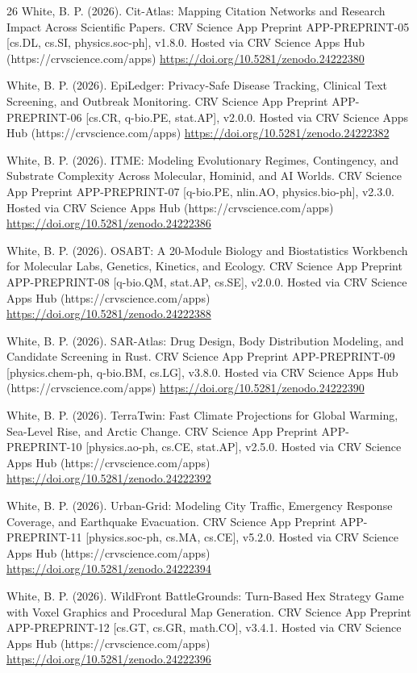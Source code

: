 \documentclass[10pt,letterpaper]{article}
\begin{document}
\begin{thebibliography}{26}
 White, B. P. (2026). Cit-Atlas: Mapping Citation Networks and Research Impact Across Scientific Papers. CRV Science App Preprint APP-PREPRINT-05 [cs.DL, cs.SI, physics.soc-ph], v1.8.0. Hosted via CRV Science Apps Hub (https://crvscience.com/apps) \url{https://doi.org/10.5281/zenodo.24222380}

 White, B. P. (2026). EpiLedger: Privacy-Safe Disease Tracking, Clinical Text Screening, and Outbreak Monitoring. CRV Science App Preprint APP-PREPRINT-06 [cs.CR, q-bio.PE, stat.AP], v2.0.0. Hosted via CRV Science Apps Hub (https://crvscience.com/apps) \url{https://doi.org/10.5281/zenodo.24222382}

 White, B. P. (2026). ITME: Modeling Evolutionary Regimes, Contingency, and Substrate Complexity Across Molecular, Hominid, and AI Worlds. CRV Science App Preprint APP-PREPRINT-07 [q-bio.PE, nlin.AO, physics.bio-ph], v2.3.0. Hosted via CRV Science Apps Hub (https://crvscience.com/apps) \url{https://doi.org/10.5281/zenodo.24222386}

 White, B. P. (2026). OSABT: A 20-Module Biology and Biostatistics Workbench for Molecular Labs, Genetics, Kinetics, and Ecology. CRV Science App Preprint APP-PREPRINT-08 [q-bio.QM, stat.AP, cs.SE], v2.0.0. Hosted via CRV Science Apps Hub (https://crvscience.com/apps) \url{https://doi.org/10.5281/zenodo.24222388}

 White, B. P. (2026). SAR-Atlas: Drug Design, Body Distribution Modeling, and Candidate Screening in Rust. CRV Science App Preprint APP-PREPRINT-09 [physics.chem-ph, q-bio.BM, cs.LG], v3.8.0. Hosted via CRV Science Apps Hub (https://crvscience.com/apps) \url{https://doi.org/10.5281/zenodo.24222390}

 White, B. P. (2026). TerraTwin: Fast Climate Projections for Global Warming, Sea-Level Rise, and Arctic Change. CRV Science App Preprint APP-PREPRINT-10 [physics.ao-ph, cs.CE, stat.AP], v2.5.0. Hosted via CRV Science Apps Hub (https://crvscience.com/apps) \url{https://doi.org/10.5281/zenodo.24222392}

 White, B. P. (2026). Urban-Grid: Modeling City Traffic, Emergency Response Coverage, and Earthquake Evacuation. CRV Science App Preprint APP-PREPRINT-11 [physics.soc-ph, cs.MA, cs.CE], v5.2.0. Hosted via CRV Science Apps Hub (https://crvscience.com/apps) \url{https://doi.org/10.5281/zenodo.24222394}

 White, B. P. (2026). WildFront BattleGrounds: Turn-Based Hex Strategy Game with Voxel Graphics and Procedural Map Generation. CRV Science App Preprint APP-PREPRINT-12 [cs.GT, cs.GR, math.CO], v3.4.1. Hosted via CRV Science Apps Hub (https://crvscience.com/apps) \url{https://doi.org/10.5281/zenodo.24222396}


\end{thebibliography}
\end{document}
